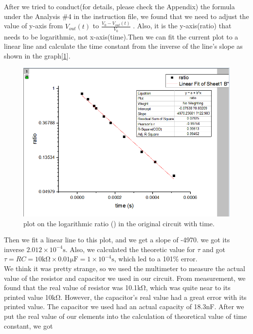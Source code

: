 \phantom{ } After we tried to conduct(for details, please check the Appendix) the formula under the Analysis \#4 in the instruction file, we found that we need to adjust the value of y-axis from $V_{out}(t)$ to $\frac{V_0 - V_{out}(t)}{V_0}$ . Also, it is the y-axis(ratio) that needs to be logarithmic, not x-axis(time).Then we can fit the current plot to a linear line and calculate the time constant from the inverse of the line's slope as shown in the graph[\ref{fig:2.2}].\\
\begin{figure}[!htbp]
	\centering %
	\begin{framed}
	\includegraphics[width=\linewidth]{images/2_2.PNG} %
	\caption{plot on the logarithmic ratio ({\tiny }) in the original circuit with time.} %
	\end{framed}
	\label{fig:2.2} %

\end{figure}
Then we fit a linear line to this plot, and we get a slope of -4970.
we got its inverse $2.012\times10^{-4}\mathrm{s}$. Also, we calculated the theoretic value for $\tau$ and got 
$\tau = RC = 10\mathrm{k\Omega} \times 0.01\mathrm{\mu F} = 1\times10^{-4}\mathrm{s}$, which led to a 101\% error.\\
\phantom{ } We think it was pretty strange, so we used the multimeter to measure the actual value of the resistor and capacitor we used in our circuit. From measurement, we found that the real value of resistor was 10.1$\mathrm{k\Omega}$, which was quite near to its printed value 10$\mathrm{k\Omega}$. However, the capacitor's real value had a great error with its printed value. The capacitor we used had an actual capacity of 18.3nF. After we put the real value of our elements into the calculation of theoretical value of time constant, we got

